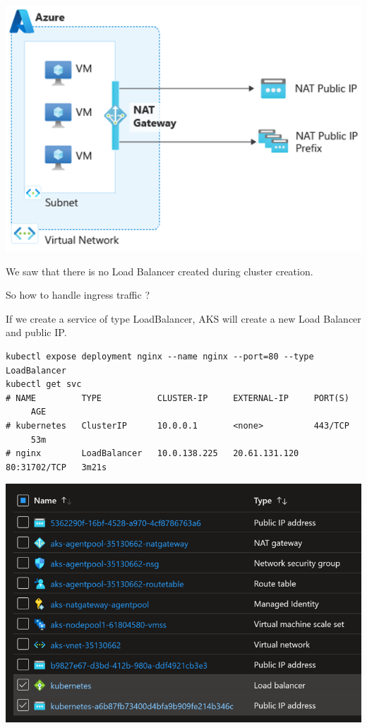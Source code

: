 \documentclass[
]{article}
\begin{document}
\includegraphics{images/65_aks_egress_lb_natgw_udr__nat-gw-architecture.png}

We saw that there is no Load Balancer created during cluster creation.

So how to handle ingress traffic ?

If we create a service of type LoadBalancer, AKS will create a new Load
Balancer and public IP.

\begin{lstlisting}
kubectl expose deployment nginx --name nginx --port=80 --type LoadBalancer
kubectl get svc
# NAME         TYPE           CLUSTER-IP     EXTERNAL-IP     PORT(S)        AGE
# kubernetes   ClusterIP      10.0.0.1       <none>          443/TCP        53m
# nginx        LoadBalancer   10.0.138.225   20.61.131.120   80:31702/TCP   3m21s
\end{lstlisting}

\includegraphics{images/65_aks_egress_lb_natgw_udr__nat-gw-lb.png}
\end{document}
